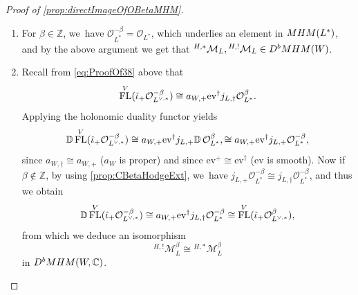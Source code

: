 \documentclass[11pt]{article}
\newcommand{\ie}{i.e.,\xspace}
\let\mathds\mathbb
\newcommand{\ev}{\mathrm{ev}}
\newcommand{\dC}{{\mathds C}}\let\C\dC
\newcommand{\dZ}{{\mathds Z}}\let\mbz\dZ\let\Z\dZ
\newcommand{\bD}{{\mathbb D}}\let\mbd\bD
\newcommand{\cD}{\mathscr{D}}
\newcommand{\cM}{\mathcal{M}}
\newcommand{\cO}{\mathcal{O}}\let\O\cO
\DeclareMathOperator{\FL}{\textup{FL}}
\newcommand{\MHM}{\textup{MHM}}
\newcommand{\Mh}{{^{H,*}}\cM_L^\beta}
\newcommand{\MhD}{{^{H,!}}\cM_L^{-\beta}}
\begin{document}
\begin{proof}[Proof of \cref{prop:directImageOfOBetaMHM}]
\begin{enumerate}
On the spaces $V$ and $L^{\vee,*}$, we~consider the isomorphisms $c_V$ and $c_{L^{\vee,*}}$ given by multiplication by $-1$ (in all variables for $c_V$ and fiberwise for~$c_{L^{\vee,*}}$). Then since the Fourier transformation $\FL^V$ and the holonomic duality commute up to the action of~$c_V$ (\ie since
$\bD\, \circ \FL^V\cong \FL^V\circ\bD\circ c_V^+$), we~obtain the following isomorphisms in $D^b(\cD_W)$ for the complex of $\cD_W$\nobreakdash-mod\-ules underlying $\MhD$:
\begin{align*}
\bD \FL^V(\hat{\iota}_+ \cO^\beta_{L^{\vee,*}}) &\simeq \FL^V \bD \, c^+_V (\hat{\iota}_+ \cO^\beta_{L^{\vee,*}}) \\
&\simeq \FL^V \bD (\hat{\iota}_+ c^+_{L^{\vee,*}} \cO^\beta_{L^{\vee,*}}) &
\begin{array}{l}
\textup{since } c_V\circ\hat{\iota}=\hat{\iota}\circ c_{L^{\vee,*}}\\ \textup{by definition of }\hat{\iota}
\end{array}
\\
&\simeq \FL^V \bD (\hat{\iota}_+ \cO^\beta_{L^{\vee,*}})
&{\exists\textup{ isom. } c^+_{L^{\vee,*}}\cO^\beta_{L^{\vee,*}}\cong \cO^\beta_{L^{\vee,*}}} \\
& \simeq \FL^V (\hat{\iota}_\dag \bD\, \cO^\beta_{L^{\vee,*}}) &
{\bD\, \hat{\iota}_+ \cong \hat{\iota}_\dag\,\bD}\\
& \simeq \FL^V (\hat{\iota}_\dag \cO^{-\beta}_{L^{\vee,*}})
& {\bD\, \cO^\beta_{L^{\vee,*}}\cong \cO^{-\beta}_{L^{\vee,*}} \textup{ by \cref{lem:OLbetaDual}}}.
\end{align*}
This shows that $\FL^V (\hat{\iota}_\dag \cO^{-\beta}_{L^{\vee,*}})$ is the complex of $\cD_W$\nobreakdash-mod\-ules underlying the object $\MhD$, as claimed.

The second statement follows directly from the fact that $\cO_{L^*}^\beta\cong\cO_{L^*}^{\beta'}$ for $\beta-\beta'\in \Z$.
\item
For $\beta\in \dZ$, we~have $\cO_{L^*}^{-\beta}=\cO_{L^*}$, which underlies an element in $\MHM(L^*)$, and by the above argument we get that
${^{H,*}}\cM_L, {^{H,!}}\cM_L \in D^b\MHM(W)$.
\item
Recall from \eqref{eq:ProofOf38} above that
\[
\FL^V(\hat{\iota}_+\cO_{L^{\vee,*}}^{-\beta}) \cong a_{W,+} \ev^\dag j_{L,\dag} \cO_{L^*}^\beta.
\]
Applying the holonomic duality functor yields
\[
\bD \FL^V(\hat{\iota}_+\cO_{L^{\vee,*}}^{-\beta})
\cong
a_{W,+} \ev^\dag j_{L,+} \bD \, \cO_{L^*}^\beta,
\cong
a_{W,+} \ev^\dag j_{L,+} \cO_{L^*}^{-\beta},
\]
since $a_{W,\dag}\cong a_{W,+}$ ($a_W$ is proper) and since $\ev^+\cong \ev^\dag$ ($\ev$ is smooth). Now if $\beta\notin\dZ$, by using \cref{prop:CBetaHodgeExt}, we~have $j_{L,+}\cO_{L^*}^{-\beta} \cong j_{L,\dag}\cO_{L^*}^{-\beta}$, and thus we obtain
\[
\bD \FL^V(\hat{\iota}_+\cO_{L^{\vee,*}}^{-\beta})
\cong
a_{W,+} \ev^\dag j_{L,\dag} \cO_{L^*}^{-\beta}
\cong
\FL^V(\hat{\iota}_+\cO_{L^{\vee,*}}^{\beta}),
\]
from which we deduce an isomorphism
\[
{^{H,!}}\cM_L^{\beta} \cong \Mh
\]
in $D^b\MHM(W,\dC)$.


\end{enumerate}
\end{proof}
\end{document}
